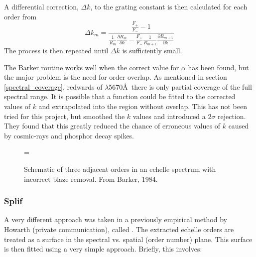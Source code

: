 A differential correction, $\Delta k$, to the grating constant is then calculated
for each order from
\begin{equation}
\Delta k_m = \frac{\frac{F_+}{F_-} - 1}
{
\frac{1}{R_m}\frac{\partial R_m}{\partial k}
- \frac{F_+}{F_-}\frac{1}{R_{m+1}}
\frac{\partial R_{m+1}}{\partial k}
}
\end{equation} 
The process is then repeated until $\Delta k$ is sufficiently small.

The Barker routine works well when the correct value for $\alpha$ has
been found, but the major problem is the need for order overlap. As
mentioned in section \ref{spectral_coverage}, redwards of
$\lambda$5670\AA\ there is only partial coverage of the full spectral
range. It is possible that a function could be fitted to the corrected
values of $k$ and extrapolated into the region without overlap. This
has not been tried for this project, but  smoothed
the $k$ values and introduced a 2$\sigma$ rejection. They found that
this greatly reduced the chance of erroneous values of $k$ caused by
cosmic-rays and phosphor decay spikes.

\begin{figure}
\epsfxsize=\figwidth
\setlength{\cen}{(\textwidth / 2) - (\epsfxsize / 2)}
\hspace{\cen}
\caption[Schematic describing blaze-removal method of
Barker]{\fcfont Schematic of three adjacent orders in an echelle spectrum with
incorrect blaze removal. From Barker, 1984.}
\label{fig:barker}
\end{figure}

\subsubsection{Splif}
A very different approach was taken in a previously empirical method
by Howarth (private communication), called . The extracted
echelle orders are treated as a surface in the spectral vs. spatial
(order number) plane. This surface is then fitted using a very simple
approach. Briefly, this involves:

